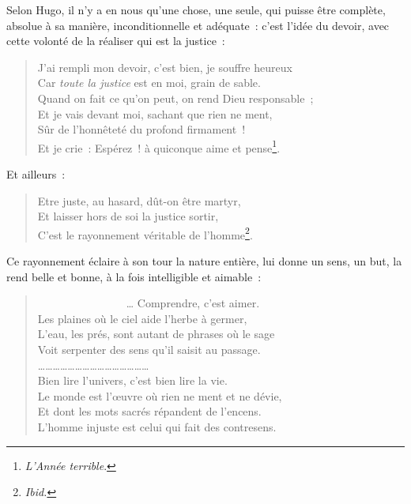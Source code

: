 \documentclass[french,twoside]{book} %
\begin{document}
\noindent Selon Hugo, il n’y a en nous qu’une chose, une seule, qui puisse être complète, absolue à sa manière, inconditionnelle et adéquate : c’est l’idée du devoir, avec cette volonté de la réaliser qui est la justice :\par


\begin{verse}
J’ai rempli mon devoir, c’est bien, je souffre heureux\\
Car \emph{toute la justice} est en moi, grain de sable.\\
Quand on fait ce qu’on peut, on rend Dieu responsable ;\\
Et je vais devant moi, sachant que rien ne ment,\\
Sûr de l’honnêteté du profond firmament !\\
Et je crie : Espérez ! à quiconque aime et pense\footnote{\emph{L’Année terrible}.}.\\
\end{verse}

\noindent Et ailleurs :\par


\begin{verse}
Etre juste, au hasard, dût-on être martyr,\\
Et laisser hors de soi la justice sortir,\\
C’est le rayonnement véritable de l’homme\footnote{\emph{Ibid.}}.\\
\end{verse}

\noindent Ce rayonnement éclaire à son tour la nature entière, lui donne un sens, un but, la rend belle et bonne, à la fois intelligible et aimable :\par


\begin{verse}
                … Comprendre, c’est aimer.\\
Les plaines où le ciel aide l’herbe à germer,\\
L’eau, les prés, sont autant de phrases où le sage\\
Voit serpenter des sens qu’il saisit au passage.\\
………………………………………\\
Bien lire l’univers, c’est bien lire la vie.\\
Le monde est l’œuvre où rien ne ment et ne dévie,\\
Et dont les mots sacrés répandent de l’encens.\\
L’homme injuste est celui qui fait des contresens.\\
\end{verse}
\end{document}
